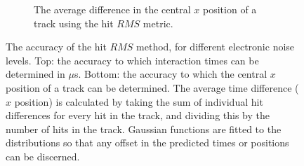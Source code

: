 \begin{figure}
\begin{subfigure}{0.6\textwidth}
    \caption{The average difference in the central $x$ position of a track using the hit $RMS$ metric.}
    \label{fig:DiffNoiseStudy_AvDiffRMS_X}
  \end{subfigure}
  \caption[Comparing the accuracy of the hit $RMS$ method, as the electronic noise changes]
          {The accuracy of the hit $RMS$ method, for different electronic noise levels. Top: the accuracy to which interaction times can be determined in $\mu$s. Bottom: the accuracy to which the central $x$ position of a track can be determined. The average time difference ($x$ position) is calculated by taking the sum of individual hit differences for every hit in the track, and dividing this by the number of hits in the track. Gaussian functions are fitted to the distributions so that any offset in the predicted times or positions can be discerned.}
  \label{fig:DiffNoiseStudy_AvDiff_RMS}
\end{figure}

